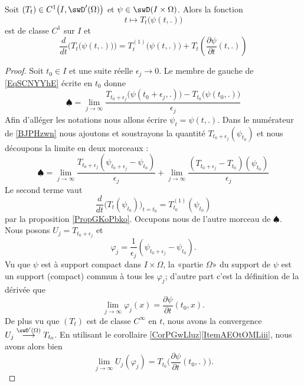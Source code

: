 \begin{proposition} \label{PropUDkgksG}
    Soit \( (T_t)\in C^1\big( I,\swD'(\Omega) \big)\) et \( \psi\in\swD(I\times \Omega)\). Alors la fonction
    \begin{equation}
        t\mapsto T_t\big( \psi(t,.) \big)
    \end{equation}
    est de classe \( C^1\) sur \( I\) et
    \begin{equation}    \label{EqSCNYYhE}
        \frac{ d }{ dt }\Big( T_t\big( \psi(t,.) \big) \Big)=T_t^{(1)}\big( \psi(t,.) \big)+T_t\left( \frac{ \partial \psi }{ \partial t }(t,.) \right)
    \end{equation}
\end{proposition}

\begin{proof}
    Soit \( t_0\in I\) et une suite réelle \( \epsilon_j\to 0\). Le membre de gauche de \eqref{EqSCNYYhE} écrite en \( t_0\) donne
    \begin{equation}    \label{BJPHzwn}
        \spadesuit=\lim_{j\to \infty} \frac{ T_{t_0+\epsilon_j}\big( \psi(t_0+\epsilon_j,.) \big)-T_{t_0}\big( \psi(t_0,.) \big) }{ \epsilon_j }
    \end{equation}
    Afin d'alléger les notations nous allons écrire \( \psi_t=\psi(t,.)\). Dans le numérateur de \eqref{BJPHzwn} nous ajoutons et soustrayons la quantité \( T_{t_0+\epsilon_j}(\psi_{t_0})\) et nous découpons la limite en deux morceaux :
    \begin{equation}
        \spadesuit=\lim_{j\to \infty} \frac{ T_{t_0+\epsilon_j}(\psi_{t_0+\epsilon_j}-\psi_{t_0}) }{ \epsilon_j }+\lim_{j\to \infty} \frac{ (T_{t_0+\epsilon_j}-T_{t_0})(\psi_{t_0}) }{ \epsilon_j }
    \end{equation}
    Le second terme vaut 
    \begin{equation}
        \frac{ d }{ dt }\Big( T_t(\psi_{t_0}) \Big)_{t=t_0}=T_{t_0}^{(1)}(\psi_{t_0})
    \end{equation}
    par la proposition \ref{PropGKoPbko}. Occupons nous de l'autre morceau de \( \spadesuit\). Nous posons \( U_j=T_{t_0+\epsilon_j}\) et 
    \begin{equation}
        \varphi_j=\frac{1}{ \epsilon_j }(\psi_{t_0+\epsilon_j}-\psi_{t_0}).
    \end{equation}
    Vu que \( \psi\) est à support compact dans \( I\times \Omega\), la «partie \( \Omega\)» du support de \( \psi\) est un support (compact) commun  à tous les \( \varphi_j\); d'autre part c'est la définition de la dérivée que
    \begin{equation}
        \lim_{j\to \infty} \varphi_j(x)=\frac{ \partial \psi }{ \partial t }(t_0,x).
    \end{equation}
    De plus vu que \( (T_t)\) est de classe \(  C^{\infty}\) en \( t\), nous avons la convergence \( U_j\stackrel{\swD'(\Omega)}{\longrightarrow}T_{t_0}\). En utilisant le corollaire \ref{CorPGwLluz}\ref{ItemAEOtOMLiii}, nous avons alors bien
    \begin{equation}
        \lim_{j\to \infty} U_j(\varphi_j)=T_{t_0}\Big( \frac{ \partial \psi }{ \partial t }(t_0,.) \Big).
    \end{equation}
\end{proof}


